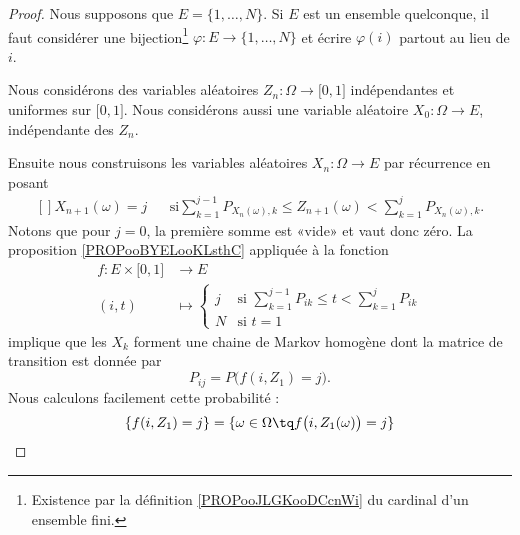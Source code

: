 \begin{proof}
	Nous supposons que \( E=\{ 1,\ldots, N \}\). Si \( E\) est un ensemble quelconque, il faut considérer une bijection\footnote{Existence par la définition \ref{PROPooJLGKooDCcnWi} du cardinal d'un ensemble fini.} \( \varphi\colon E\to \{ 1,\ldots, N \}\) et écrire \( \varphi(i)\) partout au lieu de \( i\).

	Nous considérons des variables aléatoires \( Z_n\colon \Omega \to \mathopen[ 0 , 1 \mathclose] \) indépendantes et uniformes sur \( \mathopen[ 0 , 1 \mathclose]\). Nous considérons aussi une variable aléatoire \( X_0\colon \Omega\to E\), indépendante des \( Z_n\).

	Ensuite nous construisons les variables aléatoires \( X_n\colon \Omega\to E\) par récurrence en posant
	\begin{equation}
		\begin{aligned}[]
			X_{n+1}(\omega)=j &  & \text{si} \sum_{k=1}^{j-1}P_{X_n(\omega),k}\leq Z_{n+1}(\omega)<\sum_{k=1}^jP_{X_n(\omega),k}.
		\end{aligned}
	\end{equation}
	Notons que pour \( j=0\), la première somme est «vide» et vaut donc zéro. La proposition \ref{PROPooBYELooKLsthC} appliquée à la fonction
	\begin{equation}
		\begin{aligned}
			f\colon E\times \mathopen[ 0 , 1 \mathclose] & \to E                                                                   \\
			(i,t)                                        & \mapsto \begin{cases}
				                                                       j & \text{si } \sum_{k=1}^{j-1} P_{ik}\leq t<\sum_{k=1}^jP_{ik} \\
				                                                       N & \text{si } t=1
			                                                       \end{cases}
		\end{aligned}
	\end{equation}
	implique que les \( X_k\) forment une chaine de Markov homogène dont la matrice de transition est donnée par
	\begin{equation}
		P_{ij}=P\big( f(i,Z_1)=j \big).
	\end{equation}
	Nous calculons facilement cette probabilité :
	\begin{subequations}
		\begin{align}
			\{ f(i,Z_1)=j \} & =\{ \omega\in\Omega\tq f\big( i,Z_1(\omega) \big)=j \}                                                                  \\

\end{align}
\end{subequations}
\end{proof}
